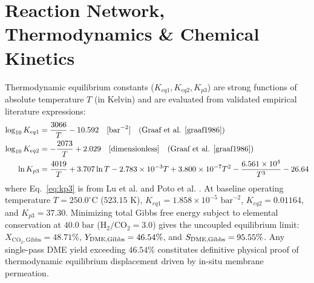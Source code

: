 \documentclass[12pt,a4paper]{article}
\begin{document}
\section{Reaction Network, Thermodynamics \& Chemical Kinetics}
Thermodynamic equilibrium constants ($K_{eq1}, K_{eq2}, K_{p3}$) are strong functions of absolute temperature $T$ (in Kelvin) and are evaluated from validated empirical literature expressions:
\begin{align}
    \log_{10} K_{eq1} &= \frac{3066}{T} - 10.592 \quad [\text{bar}^{-2}] \quad \text{(Graaf et al. \cite{graaf1986})} \label{eq:keq1} \\
    \log_{10} K_{eq2} &= -\frac{2073}{T} + 2.029 \quad [\text{dimensionless}] \quad \text{(Graaf et al. \cite{graaf1986})} \label{eq:keq2} \\
    \ln K_{p3} &= \frac{4019}{T} + 3.707 \ln T - 2.783 \times 10^{-3} T + 3.800 \times 10^{-7} T^2 - \frac{6.561 \times 10^4}{T^3} - 26.64 \label{eq:kp3}
\end{align}
where Eq.~\eqref{eq:kp3} is from Lu et al. \cite{lu2004} and Poto et al. \cite{poto2021}. At baseline operating temperature $T = 250.0^\circ\text{C}$ ($523.15\text{ K}$), $K_{eq1} = 1.858 \times 10^{-5}\text{ bar}^{-2}$, $K_{eq2} = 0.01164$, and $K_{p3} = 37.30$. Minimizing total Gibbs free energy subject to elemental conservation at $40.0\text{ bar}$ ($\text{H}_2/\text{CO}_2 = 3.0$) gives the uncoupled equilibrium limit: $X_{\text{CO}_2,\text{Gibbs}} = 48.71\%$, $Y_{\text{DME,\text{Gibbs}}} = 46.54\%$, and $S_{\text{DME,\text{Gibbs}}} = 95.55\%$. Any single-pass DME yield exceeding $46.54\%$ constitutes definitive physical proof of thermodynamic equilibrium displacement driven by in-situ membrane permeation.
\end{document}
